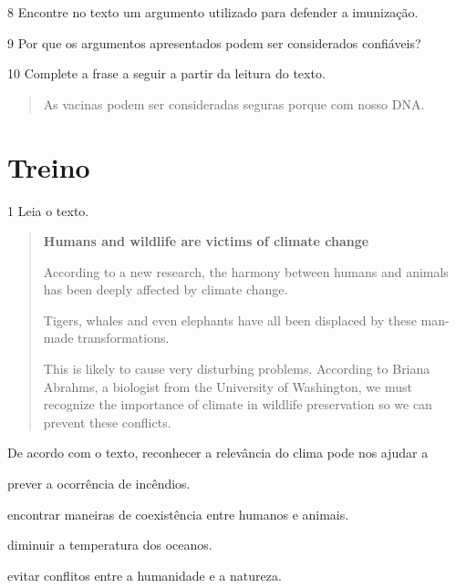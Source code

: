 
\num{8} Encontre no texto um argumento utilizado para defender a
imunização.



\num{9} Por que os argumentos apresentados podem ser considerados
confiáveis?



\num{10} Complete a frase a seguir a partir da leitura do texto.

\begin{quote}
As vacinas podem ser consideradas seguras porque  com nosso DNA.
\end{quote}

\section{Treino}

\num{1} Leia o texto.

\begin{quote}
\textbf{Humans and wildlife are victims of climate change}

According to a new research, the harmony between humans and animals has been deeply affected by climate change.

Tigers, whales and even elephants have all been displaced by these man-made transformations.

This is likely to cause very disturbing problems. According to Briana Abrahms, a biologist from the University of Washington, we must recognize the importance of climate in wildlife preservation so we can prevent these conflicts.  

\end{quote}


De acordo com o texto, reconhecer a relevância do clima pode nos ajudar a

\begin{escolha}
\item prever a ocorrência de incêndios.

\item encontrar maneiras de coexistência entre humanos e animais.

\item diminuir a temperatura dos oceanos.

\item evitar conflitos entre a humanidade e a natureza.
\end{escolha}

